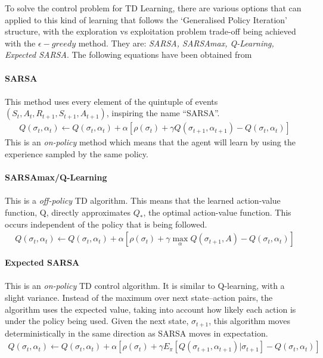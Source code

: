 \documentclass[ %
                    author={Ashwinder Khurana},
                supervisor={Prof Dave Cliff},
                    degree={MEng},
                     title={The Deeply Reinforced Trader},
                  subtitle={},
                      type={enterprise},
                      year={2020} ]{dissertation}
\begin{document}
{\noindent 
To solve the control problem for TD Learning, there are various options that can applied to this kind of learning that follows the \enquote*{Generalised Policy Iteration} structure, with the exploration vs exploitation problem trade-off being achieved with the $\epsilon-greedy$ method. They are: \textit{SARSA, SARSAmax, Q-Learning, Expected SARSA}. The following equations have been obtained from \cite{https://www.cellstrat.com/2020/04/27/temporal-difference-methods/} 
\\
\\
\textbf{SARSA}
\\
\\
This method uses every element of the quintuple of events $(S_t, A_t, R_{t+1}, S_{t+1}, A_{t+1})$, inspiring the name \enquote{SARSA}. 
\begin{equation}
\label{SARSA}
\begin{split}
Q(\sigma_t, \alpha_t) \leftarrow Q(\sigma_t, \alpha_t) + \alpha[\rho(\sigma_t) + \gamma Q(\sigma_{t+1}, \alpha_{t+1}) - Q(\sigma_t, \alpha_t)]
\end{split}
\end{equation}
\noindent
This is an \textit{on-policy} method which means that the agent will learn by using the experience sampled by the same policy. 
\\
\\
\noindent
\textbf{SARSAmax/Q-Learning}
\\
\\
This is a \textit{off-policy} TD algorithm. This means that the learned action-value function, Q, directly approximates $Q_*$, the optimal action-value function. This occurs independent of the policy that is being followed. 
\begin{equation}
\label{Q-learning}
\begin{split}
Q(\sigma_t, \alpha_t) \leftarrow Q(\sigma_t, \alpha_t) + \alpha[\rho(\sigma_t) + \gamma \max\limits^{}_{\alpha}Q(\sigma_{t+1}, A) - Q(\sigma_t, \alpha_t)]
\end{split}
\end{equation}

\noindent
\textbf{Expected SARSA}
\\
\\
This is an \textit{on-policy} TD control algorithm. It is similar to Q-learning, with a slight variance. Instead of the maximum over next state–action pairs,  the algorithm uses the expected value, taking into account how likely each action is under the policy being used. Given the next state, $\sigma_{t+1}$, this algorithm moves deterministically in the same direction as SARSA moves in expectation. 
\begin{equation}
\label{SARSA}
\begin{split}
Q(\sigma_t, \alpha_t) \leftarrow Q(\sigma_t, \alpha_t) + \alpha[\rho(\sigma_t) + \gamma E_\pi[Q(\sigma_{t+1}, \alpha_{t+1}) | \sigma_{t+1}] - Q(\sigma_t, \alpha_t)]
\end{split}
\end{equation}

}
\end{document}
